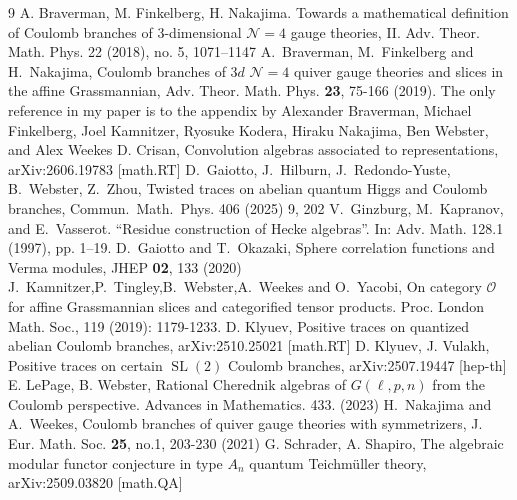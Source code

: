 \documentclass{article}
\newcommand{\mc}[1]{\mathcal{#1}}
\begin{document}
\begin{thebibliography}{9}
 A. Braverman, M. Finkelberg, H. Nakajima. Towards a mathematical definition of Coulomb branches of 3-dimensional $\mc{N}=4$ gauge theories, II. Adv. Theor. Math. Phys. 22 (2018), no. 5, 1071–1147
A.~Braverman, M.~Finkelberg and H.~Nakajima,
Coulomb branches of $3d$ $\mathcal{N}=4$ quiver gauge theories and slices in the affine Grassmannian,
Adv. Theor. Math. Phys. \textbf{23}, 75-166 (2019). The only reference in my paper is to the appendix by Alexander Braverman, Michael Finkelberg, Joel Kamnitzer, Ryosuke Kodera, Hiraku Nakajima, Ben Webster, and Alex Weekes
 D. Crisan, Convolution algebras associated to representations, arXiv:2606.19783 [math.RT]
 D.~Gaiotto, J.~Hilburn, J.~Redondo-Yuste, B.~Webster, Z.~Zhou, Twisted traces on abelian quantum Higgs and Coulomb branches, Commun.~Math.~Phys. 406 (2025) 9, 202
 V.~Ginzburg, M.~Kapranov, and E.~Vasserot. “Residue construction of
Hecke algebras”. In: Adv. Math. 128.1 (1997), pp. 1–19.
D.~Gaiotto and T.~Okazaki,
Sphere correlation functions and Verma modules,
JHEP \textbf{02}, 133 (2020)
J.~Kamnitzer,P.~Tingley,B.~Webster,A.~Weekes and O.~Yacobi, On category $\mc{O}$ for affine Grassmannian slices and categorified tensor products. Proc. London Math. Soc., 119 (2019): 1179-1233.
 D. Klyuev, Positive traces on quantized abelian Coulomb branches, arXiv:2510.25021 [math.RT]
 D. Klyuev, J. Vulakh, Positive traces on certain $\operatorname{SL}(2)$ Coulomb branches, arXiv:2507.19447 [hep-th]
 E. LePage, B. Webster, Rational Cherednik algebras of $G(\ell,p,n)$ from the Coulomb perspective. Advances in Mathematics. 433. (2023)
H.~Nakajima and A.~Weekes,
Coulomb branches of quiver gauge theories with symmetrizers,
J. Eur. Math. Soc. \textbf{25}, no.1, 203-230 (2021)
G. Schrader, A. Shapiro, The algebraic modular functor conjecture in type $A_n$ quantum Teichm\"uller theory, 	arXiv:2509.03820 [math.QA]
\end{thebibliography}
\end{document}
